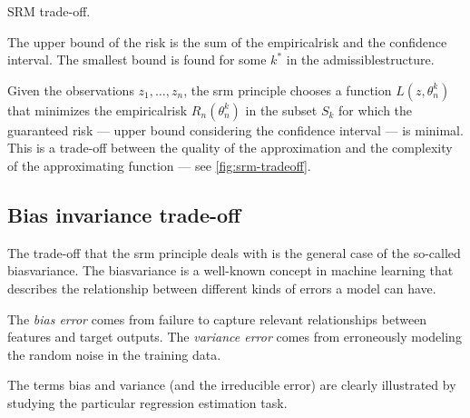\begin{figurebox}[label=fig:srm-tradeoff]{SRM trade-off.}
  \centering
  \tcblower
  The upper bound of the risk is the sum of the \gls{empiricalrisk} and the confidence
  interval.  The smallest bound is found for some $k^*$ in the \gls{admissiblestructure}.
\end{figurebox}

Given the observations $z_1, \dots, z_n$, the \gls{srm} principle chooses a function
$L(z, \theta_n^k)$ that minimizes the \gls{empiricalrisk} $R_n(\theta_n^k)$ in the subset
$S_k$ for which the guaranteed risk --- upper bound considering the confidence interval
--- is minimal.  This is a trade-off between the quality of the approximation and the
complexity of the approximating function --- see \cref{fig:srm-tradeoff}.

\subsection{Bias invariance trade-off}

The trade-off that the \gls{srm} principle deals with is the general case of the so-called
\gls{biasvariance}.  The \gls{biasvariance} is a well-known concept in
machine learning that describes the relationship between different kinds of errors a model
can have.

The \emph{bias error} comes from failure to capture relevant relationships between features
and target outputs.  The \emph{variance error} comes from erroneously modeling the random
noise in the training data.

The terms bias and variance (and the irreducible error) are clearly illustrated by
studying the particular regression estimation task.

